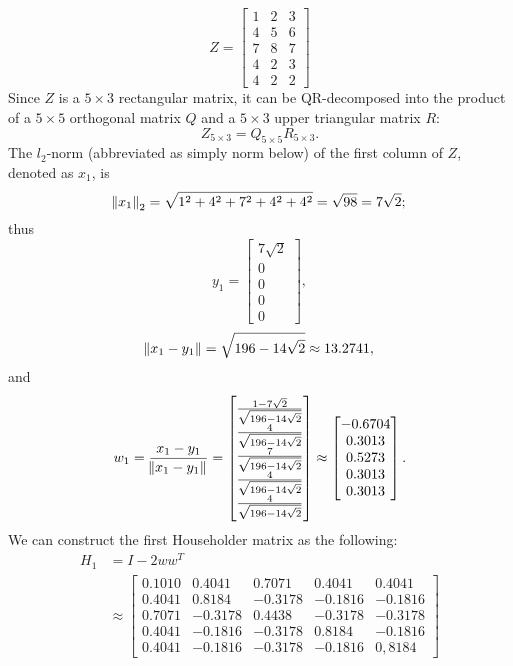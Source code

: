 \documentclass[11pt]{article}
\begin{document}
\section{}
$$Z = \begin{bmatrix} 1 & 2 & 3 \\ 4 & 5 & 6\\ 7 & 8 & 7 \\ 4 & 2 & 3 \\ 4 & 2 & 2\end{bmatrix} $$
Since $Z$ is a $5\times3$ rectangular matrix, it can be QR-decomposed into the product of a $5\times5$ orthogonal matrix $Q$ and a $5\times 3$ upper triangular matrix $R$: $$Z_{5\times3} = Q_{5\times5}R_{5\times3}.$$
The $l_2$-norm (abbreviated as simply norm below) of the first column of $Z$, denoted as $x_1$, is $$\norm{x_1}_2 = \sqrt{1^2+4^2+7^2+4^2+4^2}=\sqrt{98} = 7 \sqrt{2}; $$ thus $$y_1 = \begin{bmatrix} 7\sqrt{2}\\0\\0\\0\\0\end{bmatrix},$$ $$ \norm{x_1-y_1} = \sqrt{196-14\sqrt{2}}\approx13.2741, $$ and $$w_1 = \frac{x_1-y_1}{\norm{x_1-y_1}} = \begin{bmatrix} \frac{1-7 \sqrt{2}}{\sqrt{196-14\sqrt{2}}} \\ \frac4{\sqrt{196-14\sqrt{2}}} \\ \frac7{\sqrt{196-14\sqrt{2}}} \\ \frac4{\sqrt{196-14\sqrt{2}}} \\ \frac4{\sqrt{196-14\sqrt{2}}}\end{bmatrix}\approx \begin{bmatrix} -0.6704 \\ 0.3013 \\ 0.5273 \\ 0.3013 \\ 0.3013\end{bmatrix}. $$
We can construct the first Householder matrix as the following:
\begin{equation}\begin{split} H_1 &= I - 2ww^T\\
&\approx 
\begin{bmatrix} 
0.1010 & 0.4041 & 0.7071 & 0.4041 & 0.4041 \\ 
0.4041 & 0.8184 & -0.3178 & -0.1816 & -0.1816 \\
0.7071 & -0.3178 & 0.4438 & -0.3178 & -0.3178 \\
0.4041 & -0.1816 & -0.3178 & 0.8184 & -0.1816 \\
0.4041 & -0.1816 & -0.3178 & -0.1816 & 0,8184
\end{bmatrix}  
\end{split}\nonumber\end{equation} 
\end{document}

